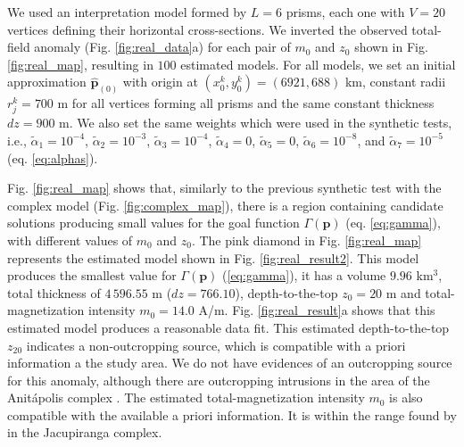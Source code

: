 We used an interpretation model formed by $L = 6$ prisms, each one with 
$V = 20$ vertices defining their horizontal cross-sections.
We inverted the observed total-field anomaly (Fig. \ref{fig:real_data}a) for each 
pair of $m_0$ and $z_0$ shown in Fig. \ref{fig:real_map}, resulting in $100$ estimated 
models. 
For all models, we set an initial approximation $\hat{\mathbf{p}}_{(0)}$ with origin 
at $(x_0^k, y_0^k) = (6921, 688)$ km, constant radii $r_j^k = 700$ m for 
all vertices forming all prisms and the same constant thickness $dz = 900$ m.
We also set the same weights which were used in the synthetic tests, i.e., $\tilde{\alpha}_1 = 10^{-4}$, 
$\tilde{\alpha}_2 = 10^{-3}$, 
$\tilde{\alpha}_3 = 10^{-4}$, $\tilde{\alpha}_4 = 0$, $\tilde{\alpha}_5 = 0$, 
$\tilde{\alpha}_6 = 10^{-8}$, and $\tilde{\alpha}_7 = 10^{-5}$ (eq. \ref{eq:alphas}). 

Fig. \ref{fig:real_map} shows that, similarly to the previous synthetic test with the 
complex model (Fig. \ref{fig:complex_map}), there is a region containing 
candidate solutions producing small values for the goal function 
$\Gamma(\mathbf{p})$ (eq. \ref{eq:gamma}), with different values of $m_0$ and $z_0$.
The pink diamond in Fig. \ref{fig:real_map} represents the estimated model 
shown in Fig. \ref{fig:real_result2}. 
This model produces the smallest value for $ \Gamma(\mathbf{p}) $ (\ref{eq:gamma}),
it has a volume $ 9.96 $ km$ ^3 $, total thickness of $ 4\,596.55 $ m 
($ dz = 766.10 $), depth-to-the-top $z_0 = 20$ m and total-magnetization intensity 
$m_0 = 14.0$ A/m.
Fig. \ref{fig:real_result}a shows that this estimated model produces a reasonable data fit.
This estimated depth-to-the-top $z_20$ indicates a non-outcropping source, 
which is compatible with a priori information a the study area. 
We do not have evidences of an outcropping source for this anomaly, 
although there are outcropping intrusions in the area of the Anit{\'a}polis 
complex \cite[]{gibson-1999}.
The estimated total-magnetization intensity $ m_0 $ is also compatible with the 
available a priori information. It is within the range found by 
\citet{valdivia-2009} in the Jacupiranga complex.

